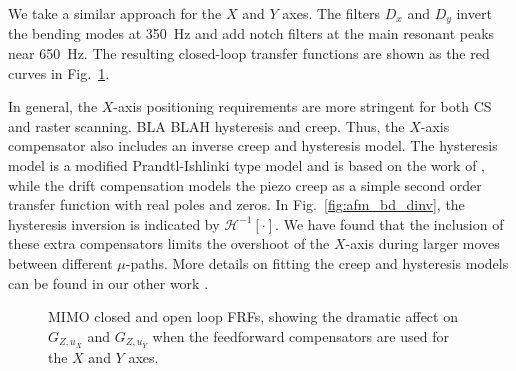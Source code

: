 \documentclass[twocolumn,oneside]{IEEEtran/IEEEtran}
\begin{document}
We take a similar approach for the $X$ and $Y$ axes. The filters $D_x$ and $D_y$ invert the bending modes at 350~Hz and add notch filters at the main resonant peaks near 650~Hz. The resulting closed-loop transfer functions are shown as the red curves in Fig.~\ref{fig:mimo_frf_uxuy}.

In general, the $X$-axis positioning requirements are more stringent for both CS and raster scanning. BLA BLAH hysteresis and creep. Thus, the $X$-axis compensator also includes an inverse creep and hysteresis model. The hysteresis model is a modified Prandtl-Ishlinki type model and is based on the work of \cite{kuhnen_modeling_2003}, while the drift compensation models the piezo creep as a simple second order transfer function with real poles and zeros. In Fig.~\ref{fig:afm_bd_dinv}, the hysteresis inversion is indicated by $\mathcal{H}^{-1}[\cdot]$. We have found that the inclusion of these extra compensators limits the overshoot of the $X$-axis during larger moves between different $\mu$-paths. More details on fitting the creep and hysteresis models can be found in our other work \cite{braker_afmmpc_2019}.




\begin{figure}
  \centering
  
  \caption{MIMO closed and open loop FRFs, showing the dramatic affect on $G_{Z,u_X}$ and $G_{Z,u_Y}$ when the feedforward compensators are used for the $X$ and $Y$ axes.}
  \label{fig:mimo_frf_uxuy}
\end{figure}



	
\end{document}
